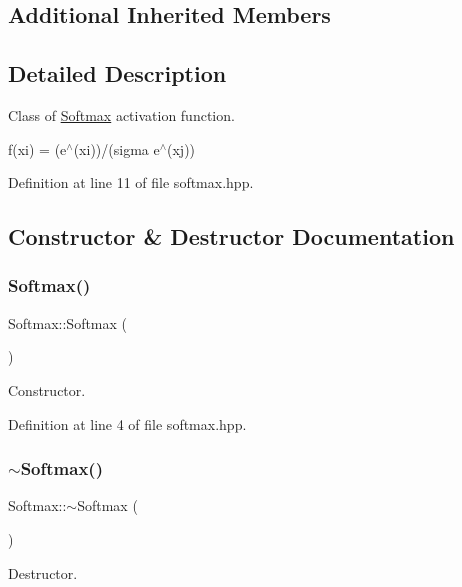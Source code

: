 \subsection*{Additional Inherited Members}


\subsection{Detailed Description}
Class of \hyperlink{class_softmax}{Softmax} activation function. 

f(xi) = (e$^\wedge$(xi))/(sigma e$^\wedge$(xj)) 

Definition at line 11 of file softmax.\+hpp.



\subsection{Constructor \& Destructor Documentation}
\mbox{\label{class_softmax_a884f7236004c14ed1b057b8e84f10861}} 
\subsubsection{\texorpdfstring{Softmax()}{Softmax()}}
{\footnotesize\ttfamily Softmax\+::\+Softmax (\begin{DoxyParamCaption}{ }\end{DoxyParamCaption})}



Constructor. 



Definition at line 4 of file softmax.\+hpp.

\mbox{\label{class_softmax_a27af7a578766bd0762a76ad3d65ee579}} 
\subsubsection{\texorpdfstring{$\sim$\+Softmax()}{~Softmax()}}
{\footnotesize\ttfamily Softmax\+::$\sim$\+Softmax (\begin{DoxyParamCaption}{ }\end{DoxyParamCaption})}



Destructor. 



